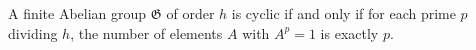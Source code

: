 A finite Abelian group $\mathfrak{G}$ of order $h$ is cyclic if and only if for each prime $p$ dividing $h$, the number of elements $A$ with $A^p = 1$ is exactly $p$.
